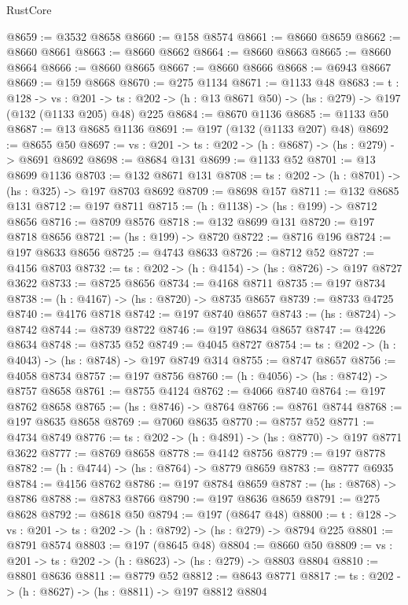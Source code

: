 \begin{lexlean}{RustCore}
\begin{coremodule}
@8659 := @3532 @8658
@8660 := @158 @8574
@8661 := @8660 @8659
@8662 := @8660 @8661
@8663 := @8660 @8662
@8664 := @8660 @8663
@8665 := @8660 @8664
@8666 := @8660 @8665
@8667 := @8660 @8666
@8668 := @6943 @8667
@8669 := @159 @8668
@8670 := @275 @1134
@8671 := @1133 @48
@8683 := {t : @128} ->
  {vs : @201} ->
  {ts : @202} -> (h : @13 @8671 @50) -> (hs : @279) -> @197 (@132 (@1133 @205) @48) @225
@8684 := @8670 @1136
@8685 := @1133 @50
@8687 := @13 @8685 @1136
@8691 := @197 (@132 (@1133 @207) @48)
@8692 := @8655 @50
@8697 := {vs : @201} -> {ts : @202} -> (h : @8687) -> (hs : @279) -> @8691 @8692
@8698 := @8684 @131
@8699 := @1133 @52
@8701 := @13 @8699 @1136
@8703 := @132 @8671 @131
@8708 := {ts : @202} -> (h : @8701) -> (hs : @325) -> @197 @8703 @8692
@8709 := @8698 @157
@8711 := @132 @8685 @131
@8712 := @197 @8711
@8715 := (h : @1138) -> (hs : @199) -> @8712 @8656
@8716 := @8709 @8576
@8718 := @132 @8699 @131
@8720 := @197 @8718 @8656
@8721 := (hs : @199) -> @8720
@8722 := @8716 @196
@8724 := @197 @8633 @8656
@8725 := @4743 @8633
@8726 := @8712 @52
@8727 := @4156 @8703
@8732 := {ts : @202} -> (h : @4154) -> (hs : @8726) -> @197 @8727 @3622
@8733 := @8725 @8656
@8734 := @4168 @8711
@8735 := @197 @8734
@8738 := (h : @4167) -> (hs : @8720) -> @8735 @8657
@8739 := @8733 @4725
@8740 := @4176 @8718
@8742 := @197 @8740 @8657
@8743 := (hs : @8724) -> @8742
@8744 := @8739 @8722
@8746 := @197 @8634 @8657
@8747 := @4226 @8634
@8748 := @8735 @52
@8749 := @4045 @8727
@8754 := {ts : @202} -> (h : @4043) -> (hs : @8748) -> @197 @8749 @314
@8755 := @8747 @8657
@8756 := @4058 @8734
@8757 := @197 @8756
@8760 := (h : @4056) -> (hs : @8742) -> @8757 @8658
@8761 := @8755 @4124
@8762 := @4066 @8740
@8764 := @197 @8762 @8658
@8765 := (hs : @8746) -> @8764
@8766 := @8761 @8744
@8768 := @197 @8635 @8658
@8769 := @7060 @8635
@8770 := @8757 @52
@8771 := @4734 @8749
@8776 := {ts : @202} -> (h : @4891) -> (hs : @8770) -> @197 @8771 @3622
@8777 := @8769 @8658
@8778 := @4142 @8756
@8779 := @197 @8778
@8782 := (h : @4744) -> (hs : @8764) -> @8779 @8659
@8783 := @8777 @6935
@8784 := @4156 @8762
@8786 := @197 @8784 @8659
@8787 := (hs : @8768) -> @8786
@8788 := @8783 @8766
@8790 := @197 @8636 @8659
@8791 := @275 @8628
@8792 := @8618 @50
@8794 := @197 (@8647 @48)
@8800 := {t : @128} -> {vs : @201} -> {ts : @202} -> (h : @8792) -> (hs : @279) -> @8794 @225
@8801 := @8791 @8574
@8803 := @197 (@8645 @48)
@8804 := @8660 @50
@8809 := {vs : @201} -> {ts : @202} -> (h : @8623) -> (hs : @279) -> @8803 @8804
@8810 := @8801 @8636
@8811 := @8779 @52
@8812 := @8643 @8771
@8817 := {ts : @202} -> (h : @8627) -> (hs : @8811) -> @197 @8812 @8804

\end{coremodule}
\end{lexlean}
